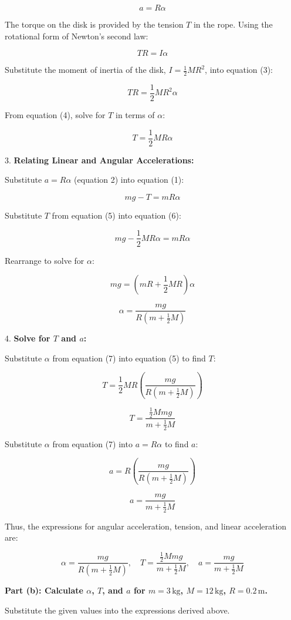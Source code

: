 \documentclass{article}
\begin{document}
\[
a = R\alpha \tag{2}
\]

The torque on the disk is provided by the tension $T$ in the rope. Using the rotational form of Newton's second law:

\[
TR = I\alpha \tag{3}
\]

Substitute the moment of inertia of the disk, $I = \frac{1}{2}MR^2$, into equation (3):

\[
TR = \frac{1}{2}MR^2\alpha \tag{4}
\]

From equation (4), solve for $T$ in terms of $\alpha$:

\[
T = \frac{1}{2}MR\alpha \tag{5}
\]

3. \textbf{Relating Linear and Angular Accelerations:}

Substitute $a = R\alpha$ (equation 2) into equation (1):

\[
mg - T = mR\alpha \tag{6}
\]

Substitute $T$ from equation (5) into equation (6):

\[
mg - \frac{1}{2}MR\alpha = mR\alpha
\]

Rearrange to solve for $\alpha$:

\[
mg = \left(mR + \frac{1}{2}MR\right)\alpha
\]

\[
\alpha = \frac{mg}{R\left(m + \frac{1}{2}M\right)} \tag{7}
\]

4. \textbf{Solve for $T$ and $a$:}

Substitute $\alpha$ from equation (7) into equation (5) to find $T$:

\[
T = \frac{1}{2}MR\left(\frac{mg}{R\left(m + \frac{1}{2}M\right)}\right)
\]

\[
T = \frac{\frac{1}{2}Mmg}{m + \frac{1}{2}M} \tag{8}
\]

Substitute $\alpha$ from equation (7) into $a = R\alpha$ to find $a$:

\[
a = R\left(\frac{mg}{R\left(m + \frac{1}{2}M\right)}\right)
\]

\[
a = \frac{mg}{m + \frac{1}{2}M} \tag{9}
\]

Thus, the expressions for angular acceleration, tension, and linear acceleration are:

\[
\boxed{\alpha = \frac{mg}{R\left(m + \frac{1}{2}M\right)}, \quad T = \frac{\frac{1}{2}Mmg}{m + \frac{1}{2}M}, \quad a = \frac{mg}{m + \frac{1}{2}M}}
\]

\textbf{Part (b): Calculate $\alpha$, $T$, and $a$ for $m = 3\,\text{kg}$, $M = 12\,\text{kg}$, $R = 0.2\,\text{m}$.}

Substitute the given values into the expressions derived above.
\end{document}
